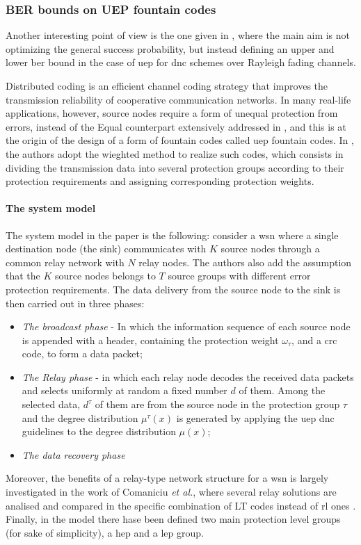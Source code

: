 \subsubsection{BER bounds on UEP fountain codes}
Another interesting point of view is the one given in \cite{Yue2014}, where the main aim is not optimizing the general success probability, but instead defining an upper and lower \gls{ber} bound in the case of \gls{uep} for \gls{dnc} schemes over Rayleigh fading channels.

Distributed coding is an efficient channel coding strategy that improves the transmission reliability of cooperative communication networks. In many real-life applications, however, source nodes require a form of unequal protection from errors, instead of the Equal counterpart extensively addressed in \cite{Pang2012}, and this is at the origin of the design of a form of fountain codes called \gls{uep} fountain codes. In \cite{Yue2014}, the authors adopt the wieghted method to realize such codes, which consists in dividing the transmission data into several protection groups according to their protection requirements and assigning corresponding protection weights.

\paragraph{The system model} \label{sec:relayBER}
The system model in the paper is the following: consider a \gls{wsn} where a single destination node (the sink) communicates with $K$ source nodes through a common relay network with $N$ relay nodes. The authors also add the assumption that the $K$ source nodes belongs to $T$ source groups with different error protection requirements. The data delivery from the source node to the sink is then carried out in three phases:
\begin{itemize}
  \item \textit{The broadcast phase} - In which the information sequence of each source node is appended with a header, containing the protection weight $\omega_\tau$, and a \gls{crc} code, to form a data packet;
  \item \textit{The Relay phase} - in which each relay node decodes the received data packets and selects uniformly at random a fixed number $d$ of them. Among the selected data, $d^\tau$ of them are from the source node in the protection group $\tau$ and the degree distribution $\mu^\tau(x)$ is generated by applying the \gls{uep} \gls{dnc} guidelines to the degree distribution $\mu(x)$;
  \item \textit{The data recovery phase}
\end{itemize}
Moreover, the benefits of a relay-type network structure for a \gls{wsn} is largely investigated in the work of Comaniciu \textit{et al.}, where several relay solutions are analised and compared in the specific combination of LT codes instead of \gls{rl} ones \cite{Comaniciu2011}.\\
Finally, in the model there hase been defined two main protection level groups (for sake of simplicity), a \gls{hep} and a \gls{lep} group.

